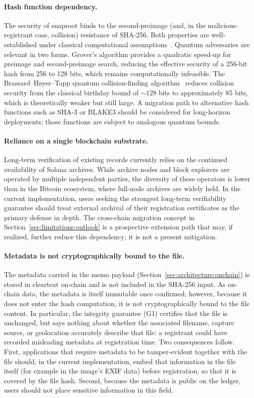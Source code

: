 \documentclass[11pt,a4paper]{article}
\begin{document}
\paragraph{Hash function dependency.} The security of snaproot binds to
the second-preimage (and, in the malicious-registrant case, collision)
resistance of SHA-256. Both properties are well-established under
classical computational assumptions~\cite{nist2015fips180}. Quantum
adversaries are relevant in two forms. Grover's algorithm provides a
quadratic speed-up for preimage and second-preimage search, reducing
the effective security of a 256-bit hash from 256 to 128 bits, which
remains computationally infeasible. The Brassard--H{\o}yer--Tapp
quantum collision-finding algorithm~\cite{brassard1998quantum} reduces
collision security from the classical birthday bound of ${\sim}128$
bits to approximately 85 bits, which is theoretically weaker but still
large. A migration path to alternative hash functions such as SHA-3 or
BLAKE3 should be considered for long-horizon deployments; those
functions are subject to analogous quantum bounds.

\paragraph{Reliance on a single blockchain substrate.} Long-term
verification of existing records currently relies on the continued
availability of Solana archives. While archive nodes and block explorers
are operated by multiple independent parties, the diversity of these
operators is lower than in the Bitcoin ecosystem, where full-node
archives are widely held. In the current implementation, users seeking
the strongest long-term verifiability guarantee should treat external
archival of their registration certificates as the primary defense in
depth. The cross-chain migration concept in
Section~\ref{sec:limitations:outlook} is a prospective extension path
that may, if realized, further reduce this dependency; it is not a
present mitigation.

\paragraph{Metadata is not cryptographically bound to the file.} The
metadata carried in the memo payload
(Section~\ref{sec:architecture:onchain}) is stored in cleartext on-chain
and is not included in the SHA-256 input. As on-chain data, the metadata
is itself immutable once confirmed; however, because it does not enter
the hash computation, it is not cryptographically bound to the file
content. In particular, the integrity guarantee (G1) certifies that the
file is unchanged, but says nothing about whether the associated
filename, capture source, or geolocation accurately describe that file:
a registrant could have recorded misleading metadata at registration
time. Two consequences follow. First, applications that require
metadata to be tamper-evident together with the file should, in the
current implementation, embed that information in the file itself (for
example in the image's EXIF data) before registration, so that it is
covered by the file hash. Second, because the metadata is public on the
ledger, users should not place sensitive information in this field.
\end{document}
